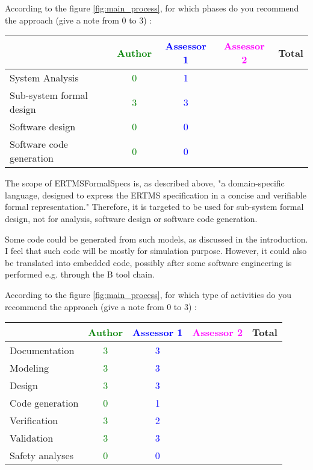 According to the figure \ref{fig:main_process}, for which phases do you recommend the approach (give a note from 0 to  3) :

\begin{tabular}{|l | c | c | c | c|}
\hline
& \textcolor{green}{Author} & \textcolor{blue}{Assessor 1} & \textcolor{magenta}{Assessor 2} & Total \\
\hline 
System Analysis & \textcolor{green}{0} & \textcolor{blue}{1} & &  \\
\hline
Sub-system formal design & \textcolor{green}{3} & \textcolor{blue}{3} & & \\
\hline
Software design & \textcolor{green}{0} & \textcolor{blue}{0} & & \\
\hline
Software code generation & \textcolor{green}{0} & \textcolor{blue}{0} & & \\
\hline
\end{tabular}

\begin{author_comment}
The scope of ERTMSFormalSpecs is, as described above, "a domain-specific language, designed to express the ERTMS specification in a concise and verifiable formal representation."
Therefore, it is targeted to be used for sub-system formal design, not for analysis, software design or software code generation.
\end{author_comment}

\begin{assessor1}
Some code could be generated from such models, as discussed in the introduction. I feel that such code will be mostly for simulation purpose. However, it could also be translated into embedded code, possibly after some software engineering is performed e.g. through the B tool chain. 
\end{assessor1}

According to the figure \ref{fig:main_process}, for which type of activities do you recommend the approach (give a note from 0 to  3) :

\begin{tabular}{|l | c | c | c | c|}
\hline
& \textcolor{green}{Author} & \textcolor{blue}{Assessor 1} & \textcolor{magenta}{Assessor 2} & Total \\
\hline 
Documentation & \textcolor{green}{3} & \textcolor{blue}{3} & &  \\
\hline
Modeling & \textcolor{green}{3} & \textcolor{blue}{3} & &  \\
\hline
Design & \textcolor{green}{3} & \textcolor{blue}{3} & & \\
\hline
Code generation & \textcolor{green}{0} & \textcolor{blue}{1} & & \\
\hline
Verification & \textcolor{green}{3} & \textcolor{blue}{2} & & \\
\hline
Validation & \textcolor{green}{3} & \textcolor{blue}{3} & & \\
\hline
Safety analyses & \textcolor{green}{0} & \textcolor{blue}{0} & & \\
\hline
\end{tabular}

